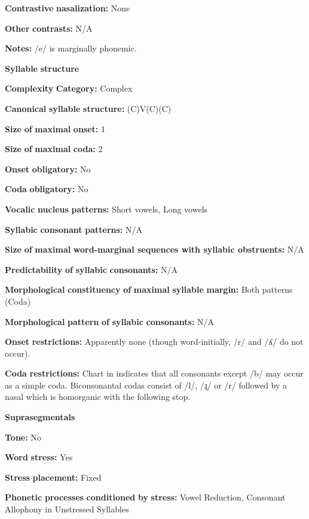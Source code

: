 \textbf{Contrastive} \textbf{nasalization:} None

\textbf{Other} \textbf{contrasts:} N/A

\textbf{Notes:} /e/ is marginally phonemic.

\textbf{Syllable} \textbf{structure}

\textbf{Complexity} \textbf{Category:} Complex

\textbf{Canonical} \textbf{syllable} \textbf{structure:} (C)V(C)(C) \citep[94-104]{Bowern2012}

\textbf{Size} \textbf{of} \textbf{maximal} \textbf{onset:} 1

\textbf{Size} \textbf{of} \textbf{maximal} \textbf{coda:} 2

\textbf{Onset} \textbf{obligatory:} No

\textbf{Coda} \textbf{obligatory:} No

\textbf{Vocalic} \textbf{nucleus} \textbf{patterns:} Short vowels, Long vowels

\textbf{Syllabic} \textbf{consonant} \textbf{patterns:} N/A

\textbf{Size} \textbf{of} \textbf{maximal} \textbf{word{}-marginal sequences with syllabic obstruents:} N/A

\textbf{Predictability} \textbf{of} \textbf{syllabic} \textbf{consonants:} N/A

\textbf{Morphological} \textbf{constituency} \textbf{of} \textbf{maximal} \textbf{syllable} \textbf{margin:} Both patterns (Coda)

\textbf{Morphological} \textbf{pattern} \textbf{of} \textbf{syllabic} \textbf{consonants:} N/A

\textbf{Onset} \textbf{restrictions:} Apparently none (though word-initially, /r/ and /ʎ/ do not occur).

\textbf{Coda} \textbf{restrictions:} Chart in \citet[102]{Bowern2012} indicates that all consonants except /b/ may occur as a simple coda. Biconsonantal codas consist of /l/, /ɻ/ or /r/ followed by a nasal which is homorganic with the following stop.

\textbf{Suprasegmentals}

\textbf{Tone:} No

\textbf{Word} \textbf{stress:} Yes

\textbf{Stress} \textbf{placement:} Fixed

\textbf{Phonetic} \textbf{processes} \textbf{conditioned} \textbf{by} \textbf{stress:} Vowel Reduction, Consonant Allophony in Unstressed Syllables

